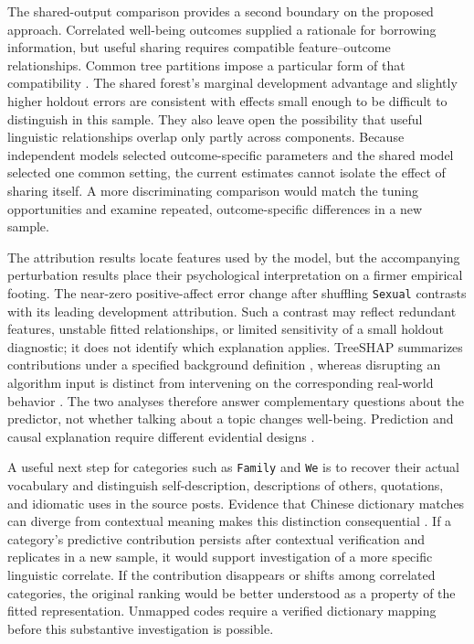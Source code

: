 The shared-output comparison provides a second boundary on the proposed approach. Correlated well-being outcomes supplied a rationale for borrowing information, but useful sharing requires compatible feature--outcome relationships. Common tree partitions impose a particular form of that compatibility \citep{caruana1997,kocev2007}. The shared forest's marginal development advantage and slightly higher holdout errors are consistent with effects small enough to be difficult to distinguish in this sample. They also leave open the possibility that useful linguistic relationships overlap only partly across components. Because independent models selected outcome-specific parameters and the shared model selected one common setting, the current estimates cannot isolate the effect of sharing itself. A more discriminating comparison would match the tuning opportunities and examine repeated, outcome-specific differences in a new sample.

The attribution results locate features used by the model, but the accompanying perturbation results place their psychological interpretation on a firmer empirical footing. The near-zero positive-affect error change after shuffling \texttt{Sexual} contrasts with its leading development attribution. Such a contrast may reflect redundant features, unstable fitted relationships, or limited sensitivity of a small holdout diagnostic; it does not identify which explanation applies. TreeSHAP summarizes contributions under a specified background definition \citep{lundberg2020}, whereas disrupting an algorithm input is distinct from intervening on the corresponding real-world behavior \citep{janzing2020}. The two analyses therefore answer complementary questions about the predictor, not whether talking about a topic changes well-being. Prediction and causal explanation require different evidential designs \citep{shmueli2010}.

A useful next step for categories such as \texttt{Family} and \texttt{We} is to recover their actual vocabulary and distinguish self-description, descriptions of others, quotations, and idiomatic uses in the source posts. Evidence that Chinese dictionary matches can diverge from contextual meaning makes this distinction consequential \citep{zhao2016}. If a category's predictive contribution persists after contextual verification and replicates in a new sample, it would support investigation of a more specific linguistic correlate. If the contribution disappears or shifts among correlated categories, the original ranking would be better understood as a property of the fitted representation. Unmapped codes require a verified dictionary mapping before this substantive investigation is possible.

